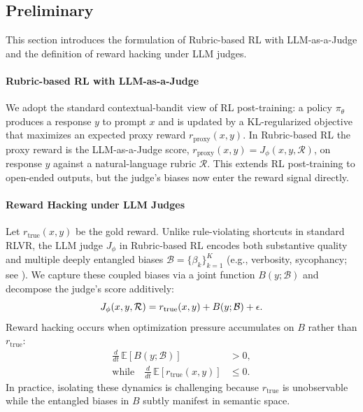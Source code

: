 \documentclass[11pt]{article}
\begin{document}
\subsection{Preliminary}
\label{sec:preliminaries}
This section introduces the formulation of Rubric-based RL with LLM-as-a-Judge and the definition of reward hacking under LLM judges.

\paragraph{Rubric-based RL with LLM-as-a-Judge}
\label{subsec:rubrics_formulation}
We adopt the standard contextual-bandit view of RL post-training: a policy $\pi_\theta$ produces a response $y$ to prompt $x$ and is updated by a KL-regularized objective that maximizes an expected proxy reward $r_{\text{proxy}}(x, y)$. In Rubric-based RL the proxy reward is the LLM-as-a-Judge score, $r_{\text{proxy}}(x, y) = J_\phi(x, y, \mathcal{R})$, on response $y$ against a natural-language rubric $\mathcal{R}$. This extends RL post-training to open-ended outputs, but the judge's biases now enter the reward signal directly.

\paragraph{Reward Hacking under LLM Judges}
\label{subsec:hacking_definition}
Let $r_{\text{true}}(x, y)$ be the gold reward. Unlike rule-violating shortcuts in standard RLVR, the LLM judge $J_\phi$ in Rubric-based RL encodes both substantive quality and multiple deeply entangled biases $\mathcal{B} = \{\beta_k\}_{k=1}^K$ (e.g., verbosity, sycophancy; see \citet{liGenerationJudgment2024, chenHumansLLMsJudge2024, yeJusticePrejudice2024}). We capture these coupled biases via a joint function $B(y; \mathcal{B})$ and decompose the judge's score additively:
\begin{equation}
\small
    J_\phi(x, y, \mathcal{R}) = r_{\text{true}}(x, y) + B(y; \mathcal{B}) + \epsilon.
    \label{eq:judge_decomp}
\end{equation}
Reward hacking occurs when optimization pressure accumulates on $B$ rather than $r_{\text{true}}$:{
\small
\begin{align*}
    \tfrac{d}{dt}\, \mathbb{E}[B(y; \mathcal{B})] &> 0, \\
    \text{while} \quad \tfrac{d}{dt}\, \mathbb{E}[r_{\text{true}}(x, y)] &\le 0.
\end{align*}}
In practice, isolating these dynamics is challenging because $r_{\text{true}}$ is unobservable while the entangled biases in $B$ subtly manifest in semantic space. 
\end{document}
